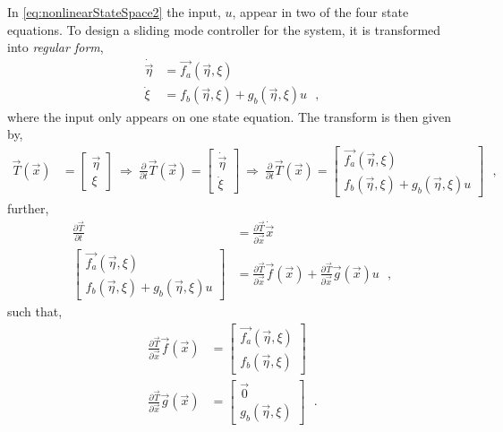 In \autoref{eq:nonlinearStateSpace2} the input, $u$, appear in two of the four state equations. To design a sliding mode controller for the system, it is transformed into \textit{regular form}, 
\begin{align}
\dot{\vec{\eta}} &=  \vec{f_a}(\vec{\eta},\xi) \nonumber   \\
\dot{\xi}        &=  f_b(\vec{\eta},\xi) + g_b(\vec{\eta},\xi) u    \ \ \ ,
\label{eq:regularForm}
\end{align}
%
where the input only appears on one state equation.
The transform is then given by,
\begin{align}
  \vec{T}(\vec{x}) &=
  \begin{bmatrix}
    \vec{\eta} \\
    \xi
  \end{bmatrix}
  \ \Rightarrow \ 
  \frac{\partial}{\partial t}\vec{T}(\vec{x})
  =
  \begin{bmatrix}
    \dot{\vec{\eta}} \\
    \dot{\xi}
  \end{bmatrix}
  \ \Rightarrow \ 
  \frac{\partial}{\partial t}\vec{T}(\vec{x})
  =
  \begin{bmatrix}
    \vec{f_a}(\vec{\eta},\xi)         \\
    f_b(\vec{\eta},\xi) + g_b(\vec{\eta},\xi) u
  \end{bmatrix}
   \ \ \ ,
  \label{eq:transformAndDerivative}
\end{align}
further,
\begin{align}
  \frac{\partial \vec{T}}{\partial t} &= \frac{\partial \vec{T}}{\partial \vec{x}}  \dot{\vec{x}} \\
  \begin{bmatrix}
    \vec{f_a}(\vec{\eta},\xi)         \\
    f_b(\vec{\eta},\xi) + g_b(\vec{\eta},\xi) u
  \end{bmatrix}
  &=
  \frac{\partial \vec{T}}{\partial \vec{x}} \vec{f}(\vec{x}) + \frac{\partial \vec{T}}{\partial \vec{x}} \vec{g}(\vec{x}) u
  \ \ \ ,
  \label{eq:transformDerivative}
\end{align}
such that,
\begin{align}
  \frac{\partial \vec{T}}{\partial \vec{x}} \vec{f}(\vec{x})    
  &= 
  \begin{bmatrix}
    \vec{f_a}(\vec{\eta},\xi)       \\
    f_b(\vec{\eta},\xi)
  \end{bmatrix} \\
  \frac{\partial \vec{T}}{\partial \vec{x}} \vec{g}(\vec{x})
  &= 
  \begin{bmatrix}
    \vec{0}        \\
    g_b(\vec{\eta},\xi)
  \end{bmatrix}
  \ \ \ .
  \label{eq:transformXDerivative}
\end{align}
